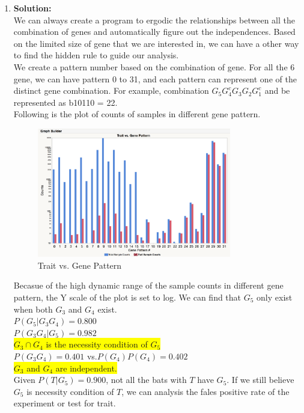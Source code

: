 \documentclass{article}
\newcommand{\mysolu}{\textbf{Solution:}\\}
\begin{document}
\begin{enumerate}
\begin{enumerate}
		\item
		\mysolu
		We can always create a program to ergodic the relationships between all the combination of genes and automatically figure out the independences. Based on the limited size of gene that we are interested in, we can have a other way to find the hidden rule to guide our analysis.\\
		We create a pattern number based on the combination of gene. For all the 6 gene, we can have pattern 0 to 31, and each pattern can represent one of the distinct gene combination. For example, combination ${G_5 G_4^c G_3 G_2 G_1^c}$ and be represented as b10110 = 22.\\
		Following is the plot of counts of samples in different gene pattern.\\
		\begin{figure}[H]
			\caption{Trait vs. Gene Pattern}
			\centering
			\includegraphics[width=0.8\textwidth]{bat.png}
		\end{figure}
		Becasue of the high dynamic range of the sample counts in different gene pattern, the Y scale of the plot is set to log. We can find that ${G_5}$ only exist when both ${G_3}$ and ${G_4}$ exist.\\
		${P(G_5|G_3G_4)=0.800}$\\
		${P(G_3G_4|G_5) =0.982}$\\
		\colorbox{yellow}{${G_3 \cap G_4}$ is the necessity condition of ${G_5}$}\\
		${P(G_3G_4) = 0.401}$ vs.${P(G_4)P(G_4)=0.402}$\\ 
		\colorbox{yellow}{${G_3}$ and ${G_4}$ are independent.}\\
		Given ${P(T|G_5) = 0.900}$, not all the bats with ${T}$ have ${G_5}$. If we still believe ${G_5}$ is necessity condition of ${T}$, we can analysis the fales positive rate of the experiment or test for trait.\\

\end{enumerate}
\end{enumerate}
\end{document}
